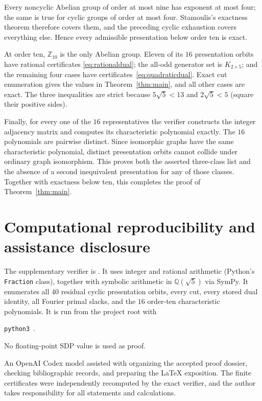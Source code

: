 \documentclass[11pt]{article}
\begin{document}
Every noncyclic Abelian group of order at most nine has exponent at most four;
the same is true for cyclic groups of order at most four.  Stamoulis's
exactness theorem therefore covers them, and the preceding cyclic exhaustion
covers everything else.  Hence every admissible presentation below order ten
is exact.

At order ten, $\mathbb Z_{10}$ is the only Abelian group.  Eleven of its
$16$ presentation orbits have rational certificates
\eqref{eq:rationaldual}; the all-odd generator set is $K_{2\times5}$; and the
remaining four cases have certificates~\eqref{eq:quadraticdual}.  Exact cut
enumeration gives the values in Theorem~\ref{thm:main}, and all other cases
are exact.  The three inequalities are strict because
$5\sqrt5<13$ and $2\sqrt5<5$ (square their positive sides).

Finally, for every one of the $16$ representatives the verifier constructs
the integer adjacency matrix and computes its characteristic polynomial
exactly.  The $16$ polynomials are pairwise distinct.  Since isomorphic graphs
have the same characteristic polynomial, distinct presentation orbits cannot
collide under ordinary graph isomorphism.  This proves both the asserted
three-class list and the absence of a second inequivalent presentation for
any of those classes.  Together with exactness below ten, this completes the
proof of Theorem~\ref{thm:main}.

\section*{Computational reproducibility and assistance disclosure}

The supplementary verifier is .  It uses
integer and rational arithmetic (Python's \texttt{Fraction} class), together
with symbolic arithmetic in $\mathbb Q(\sqrt5)$ via SymPy.  It enumerates all $40$ residual cyclic
presentation orbits, every cut, every stored dual identity, all Fourier primal
slacks, and the $16$ order-ten characteristic polynomials.  It is run from the
project root with
\begin{center}
\texttt{python3}\ .
\end{center}
No floating-point SDP value is used as proof.

An OpenAI Codex model assisted with organizing the accepted proof dossier,
checking bibliographic records, and preparing the LaTeX exposition.  The
finite certificates were independently recomputed by the exact verifier, and
the author takes responsibility for all statements and calculations.



\end{document}

